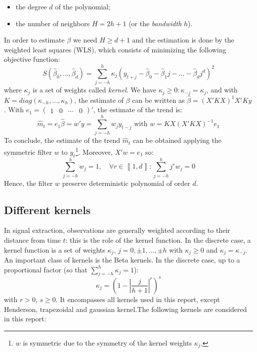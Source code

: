 \documentclass[
  12pt,
  ,
  a4paper]{article}
\newcommand\1{\mathds{1}}
\begin{document}
\begin{itemize}
\item
  the degree \(d\) of the polynomial;
\item
  the number of neighbors \(H=2h+1\) (or the \emph{bandwidth} \(h\)).
\end{itemize}

In order to estimate \(\beta\) we need \(H\geq d+1\) and the estimation is done by the weighted least squares (WLS), which consists of minimizing the following objective function:
\[
S(\hat{\beta}_{0},\dots,\hat{\beta}_{d})=\sum_{j=-h}^{h}\kappa_{j}(y_{t+j}-\hat{\beta}_{0}-\hat{\beta}_{1}j-\dots-\hat{\beta}_{d}j^{d})^{2}
\]
where \(\kappa_j\) is a set of weights called \emph{kernel}. We have \(\kappa_j\geq 0:\kappa_{-j}=\kappa_j\), and with \(K=diag(\kappa_{-h},\dots,\kappa_{h})\), the estimate of \(\beta\) can be written as \(\hat{\beta}=(X'KX)^{1}X'Ky\).
With \(e_{1}=\begin{pmatrix}1&0&\cdots&0\end{pmatrix}'\), the estimate of the trend is:
\[
\hat{m}_{t}=e_{1}\hat{\beta}=w'y=\sum_{j=-h}^{h}w_{j}y_{t-j}\text{ with }w=KX(X'KX)^{-1}e_{1}
\]
To conclude, the estimate of the trend \(\hat{m}_{t}\) can be obtained applying the symmetric filter \(w\) to \(y_t\)\footnote{\(w\) is symmetric due to the symmetry of the kernel weights \(\kappa_j\).}.
Moreover, \(X'w=e_{1}\) so:
\[
\sum_{j=-h}^{h}w_{j}=1,\quad\forall r\in\left\llbracket 1,d\right\rrbracket :\sum_{j=-h}^{h}j^{r}w_{j}=0
\]
Hence, the filter \(w\) preserve deterministic polynomial of order \(d\).

\hypertarget{sec:kernels}{%
\subsection{Different kernels}\label{sec:kernels}}

In signal extraction, observations are generally weighted according to their distance from time \(t\): this is the role of the kernel function.
In the discrete case, a kernel function is a set of weights \(\kappa_j\), \(j=0,\pm1,\dots,\pm h\) with \(\kappa_j \geq0\) and \(\kappa_j=\kappa_{-j}\).
An important class of kernels is the Beta kernels. In the discrete case, up to a proportional factor (so that \(\sum_{j=-h}^h\kappa_j=1\)):
\[
\kappa_j = \left(
  1-
  \left\lvert
  \frac j {h+1}
  \right\lvert^r
\right)^s
\]
with \(r>0\), \(s\geq 0\).
It encompasses all kernels used in this report, except Henderson, trapezoidal and gaussian kernel.The following kernels are considered in this report:
\end{document}
